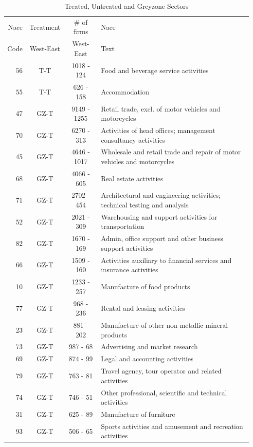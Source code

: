 \begin{table}[htbp]\centering
\setlength\tabcolsep{3pt}
\small
\caption{Treated, Untreated and Greyzone Sectors}\label{table:sectorOverview}
\begin{threeparttable}
    \begin{tabular}{r|c|c|l}
    \toprule
Nace & Treatment & \# of firms & Nace  \\
Code & West-East & West-East & Text\\
\midrule
56&	T-T&	1018 - 124&	Food and beverage service activities\\
55&	T-T&	626 - 158&	Accommodation\\
\midrule
47&	GZ-T&	9149 - 1255&	Retail trade, excl. of motor vehicles and motorcycles\\
70&	GZ-T&	6270 - 313&	Activities of head offices; management consultancy activities\\
45&	GZ-T&	4646 - 1017&	Wholesale and retail trade and repair of motor vehicles and motorcycles\\
68&	GZ-T&	4066 - 605&	Real estate activities\\
71&	GZ-T&	2702 - 454&	Architectural and engineering activities; technical testing and analysis\\
52&	GZ-T&	2021 - 309&	Warehousing and support activities for transportation\\
82&	GZ-T&	1670 - 169&	Admin, office support and other business support activities\\
66&	GZ-T&	1509 - 160&	Activities auxiliary to financial services and insurance activities\\
10&	GZ-T&	1233 - 257&	Manufacture of food products\\
77&	GZ-T&	968 - 236&	Rental and leasing activities\\
23&	GZ-T&	881 - 202&	Manufacture of other non-metallic mineral products\\
73&	GZ-T&	987 - 68&	Advertising and market research\\
69&	GZ-T&	874 - 99&	Legal and accounting activities\\
79&	GZ-T&	763 - 81&	Travel agency, tour operator and related activities\\
74&	GZ-T&	746 - 51&	Other professional, scientific and technical activities\\
31&	GZ-T&	625 - 89&	Manufacture of furniture\\
93&	GZ-T&	506 - 65&	Sports activities and amusement and recreation activities\\

\end{tabular}
\end{threeparttable}
\end{table}
